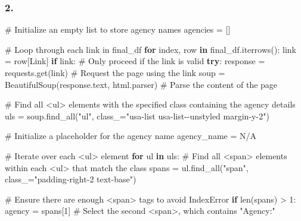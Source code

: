 \documentclass[
  letterpaper,
  DIV=11,
  numbers=noendperiod]{scrartcl}
\newenvironment{Shaded}{\begin{snugshade}}{\end{snugshade}}
\newcommand{\BuiltInTok}[1]{\textcolor[rgb]{0.00,0.23,0.31}{#1}}
\newcommand{\CommentTok}[1]{\textcolor[rgb]{0.37,0.37,0.37}{#1}}
\newcommand{\ControlFlowTok}[1]{\textcolor[rgb]{0.00,0.23,0.31}{\textbf{#1}}}
\newcommand{\DecValTok}[1]{\textcolor[rgb]{0.68,0.00,0.00}{#1}}
\newcommand{\KeywordTok}[1]{\textcolor[rgb]{0.00,0.23,0.31}{\textbf{#1}}}
\newcommand{\NormalTok}[1]{\textcolor[rgb]{0.00,0.23,0.31}{#1}}
\newcommand{\OperatorTok}[1]{\textcolor[rgb]{0.37,0.37,0.37}{#1}}
\newcommand{\StringTok}[1]{\textcolor[rgb]{0.13,0.47,0.30}{#1}}
\begin{document}
\subsubsection{2.}\label{section-1}

\begin{Shaded}
\begin{Highlighting}[]
\CommentTok{\# Initialize an empty list to store agency names}
\NormalTok{agencies }\OperatorTok{=}\NormalTok{ []}

\CommentTok{\# Loop through each link in final\_df}
\ControlFlowTok{for}\NormalTok{ index, row }\KeywordTok{in}\NormalTok{ final\_df.iterrows():}
\NormalTok{    link }\OperatorTok{=}\NormalTok{ row[}\StringTok{\textquotesingle{}Link\textquotesingle{}}\NormalTok{]}
    \ControlFlowTok{if}\NormalTok{ link:  }\CommentTok{\# Only proceed if the link is valid}
        \ControlFlowTok{try}\NormalTok{:}
\NormalTok{            response }\OperatorTok{=}\NormalTok{ requests.get(link)  }\CommentTok{\# Request the page using the link}
\NormalTok{            soup }\OperatorTok{=}\NormalTok{ BeautifulSoup(response.text, }\StringTok{\textquotesingle{}html.parser\textquotesingle{}}\NormalTok{)  }\CommentTok{\# Parse the content of the page}

            \CommentTok{\# Find all \textless{}ul\textgreater{} elements with the specified class containing the agency details}
\NormalTok{            uls }\OperatorTok{=}\NormalTok{ soup.find\_all(}\StringTok{"ul"}\NormalTok{, class\_}\OperatorTok{=}\StringTok{"usa{-}list usa{-}list{-}{-}unstyled margin{-}y{-}2"}\NormalTok{)}
            
            \CommentTok{\# Initialize a placeholder for the agency name}
\NormalTok{            agency\_name }\OperatorTok{=} \StringTok{\textquotesingle{}N/A\textquotesingle{}}
            
            \CommentTok{\# Iterate over each \textless{}ul\textgreater{} element}
            \ControlFlowTok{for}\NormalTok{ ul }\KeywordTok{in}\NormalTok{ uls:}
                \CommentTok{\# Find all \textless{}span\textgreater{} elements within each \textless{}ul\textgreater{} that match the class}
\NormalTok{                spans }\OperatorTok{=}\NormalTok{ ul.find\_all(}\StringTok{"span"}\NormalTok{, class\_}\OperatorTok{=}\StringTok{"padding{-}right{-}2 text{-}base"}\NormalTok{)}
                
                \CommentTok{\# Ensure there are enough \textless{}span\textgreater{} tags to avoid IndexError}
                \ControlFlowTok{if} \BuiltInTok{len}\NormalTok{(spans) }\OperatorTok{\textgreater{}} \DecValTok{1}\NormalTok{:}
\NormalTok{                    agency }\OperatorTok{=}\NormalTok{ spans[}\DecValTok{1}\NormalTok{]  }\CommentTok{\# Select the second \textless{}span\textgreater{}, which contains "Agency:"}
                    

\end{Highlighting}
\end{Shaded}
\end{document}
